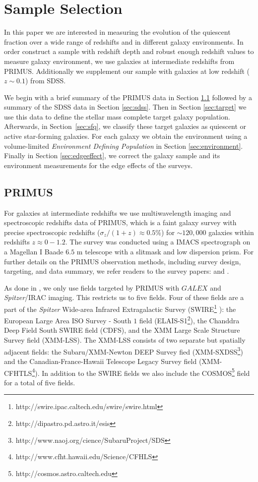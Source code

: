 \documentclass{emulateapj}
\begin{document}
\section{Sample Selection} \label{sec:sample}
In this paper we are interested in measuring the evolution of the quiescent 
fraction over a wide range of redshifts and in different galaxy environments. 
In order construct a sample with redshift depth and robust enough redshift values 
to measure galaxy environment, we use galaxies at intermediate redshifts from PRIMUS. 
Additionally we supplement our sample with galaxies at low redshift ($z \sim 0.1$) from SDSS.

We begin with a brief summary of the PRIMUS data in Section \ref{sec:primus} followed by a summary of the SDSS data in Section \ref{sec:sdss}.
Then in Section \ref{sec:target} we use this data to define the stellar mass complete target galaxy population.
Afterwards, in Section~\ref{sec:sfq}, we classify these target galaxies as quiescent or active star-forming galaxies. 
For each galaxy we obtain the environment using a volume-limited {\em Environment Defining Population} in Section \ref{sec:environment}. 
Finally in Section \ref{sec:edgeeffect}, we correct the galaxy sample and its environment measurements for the edge effects of the surveys. 

\subsection{PRIMUS} \label{sec:primus}
For galaxies at intermediate redshifts we use multiwavelength imaging and spectroscopic redshifts data of PRIMUS, which is a faint galaxy survey with precise spectroscopic redshifts ($\sigma_z/(1+z) \approx 0.5 \%$) for $\sim 120,000$ galaxies within redshifts $z \approx 0-1.2$.
The survey was conducted using a IMACS spectrograph on a Magellan I Baade $6.5$ m telescope with a slitmask and low dispersion prism.
For further details on the PRIMUS observation methods, including survey design, targeting, and data summary, we refer readers to the survey papers: \cite{Coil:2011aa} and \cite{Cool:2013aa}.

As done in \cite{Moustakas:2013aa}, we only use fields targeted by PRIMUS with $GALEX$ and {\em Spitzer}/IRAC imaging.
This restricts us to five fields.
Four of these fields are a part of the {\em Spitzer} Wide-area Infrared Extragalactic Survey (SWIRE\footnote{http://swire.ipac.caltech.edu/swire/swire.html} ): 
the European Large Area ISO Survey - South $1$ field (ELAIS-S1\footnote{http://dipastro.pd.astro.it/esis}), the Chanddra Deep Field South SWIRE field (CDFS), 
and the XMM Large Scale Structure Survey field (XMM-LSS).
The XMM-LSS consists of two separate but spatially adjacent fields: the Subaru/XMM-Newton DEEP Survey fied (XMM-SXDSS\footnote{http://www.naoj.org/cience/SubaruProject/SDS})
and the Canadian-France-Hawaii Telescope Legacy Survey field (XMM-CFHTLS\footnote{http://www.cfht.hawaii.edu/Science/CFHLS}).
In addition to the SWIRE fields we also include the COSMOS\footnote{http://cosmos.astro.caltech.edu} field for a total of five fields. 
\end{document}
